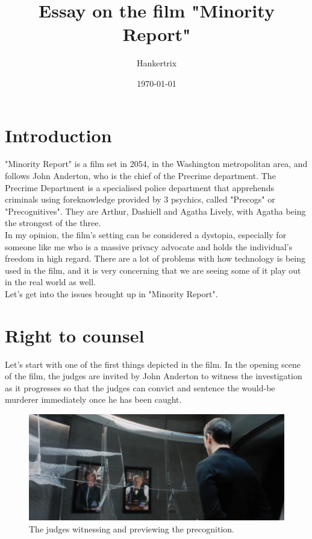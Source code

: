 \documentclass[11pt]{article}
\author{Hankertrix}
\date{\today}
\title{Essay on the film "Minority Report"}
\begin{document}
\maketitle
\setcounter{tocdepth}{2}
\tableofcontents \clearpage
\section{Introduction}
\label{sec:org3b48c5c}
"Minority Report" is a film set in 2054, in the
Washington metropolitan area, and follows John Anderton,
who is the chief of the Precrime department.
The Precrime Department is a specialised police department
that apprehends criminals using foreknowledge provided by
3 psychics, called "Precogs" or "Precognitives".
They are Arthur, Dashiell and Agatha Lively,
with Agatha being the strongest of the three.  \\

In my opinion, the film's setting can be considered
a dystopia, especially for someone like me who is a massive
privacy advocate and holds the individual's freedom in high regard.
There are a lot of problems with how technology is being used in
the film, and it is very concerning that we are seeing some of
it play out in the real world as well.  \\

Let's get into the issues brought up in "Minority Report".

\section{Right to counsel}
\label{sec:orgd4ea62b}
Let's start with one of the first things depicted in the film.
In the opening scene of the film, the judges are invited by
John Anderton to witness the investigation as it progresses
so that the judges can convict and sentence the would-be murderer
immediately once he has been caught.  \\

\begin{figure}[htbp]
\centering
\includegraphics[width=.9\linewidth]{./images/judges-witnessing-and-previewing-the-precognition.png}
\caption{The judges witnessing and previewing the precognition.}
\end{figure}
\end{document}
